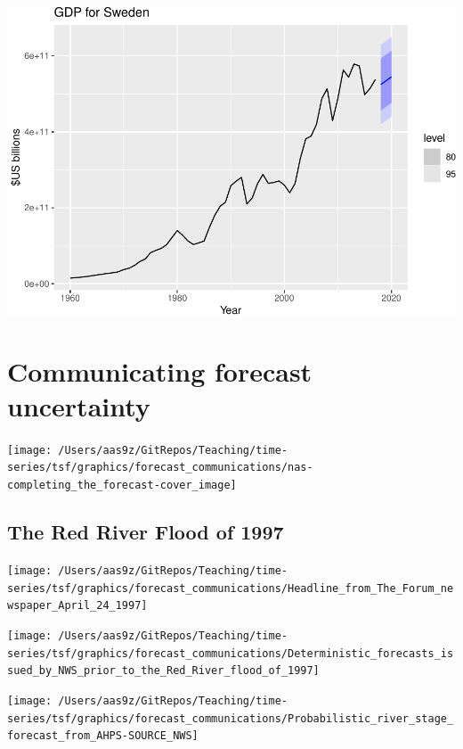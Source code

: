 \documentclass[
]{book}
\newenvironment{Shaded}{\begin{snugshade}}{\end{snugshade}}
\newcommand{\FunctionTok}[1]{\textcolor[rgb]{0.00,0.00,0.00}{#1}}
\newcommand{\NormalTok}[1]{#1}
\newcommand{\SpecialCharTok}[1]{\textcolor[rgb]{0.00,0.00,0.00}{#1}}
\newcommand{\StringTok}[1]{\textcolor[rgb]{0.31,0.60,0.02}{#1}}
\begin{document}
\begin{Shaded}
\end{Shaded}

\includegraphics{graphics/visualize forecasts 2-1.pdf}

\hypertarget{communicating-forecast-uncertainty}{%
\chapter{Communicating forecast uncertainty}\label{communicating-forecast-uncertainty}}

\texttt{[image: /Users/aas9z/GitRepos/Teaching/time-series/tsf/graphics/forecast\_communications/nas-completing\_the\_forecast-cover\_image]}

\hypertarget{the-red-river-flood-of-1997}{%
\section{The Red River Flood of 1997}\label{the-red-river-flood-of-1997}}

\texttt{[image: /Users/aas9z/GitRepos/Teaching/time-series/tsf/graphics/forecast\_communications/Headline\_from\_The\_Forum\_newspaper\_April\_24\_1997]}

\texttt{[image: /Users/aas9z/GitRepos/Teaching/time-series/tsf/graphics/forecast\_communications/Deterministic\_forecasts\_issued\_by\_NWS\_prior\_to\_the\_Red\_River\_flood\_of\_1997]}

\texttt{[image: /Users/aas9z/GitRepos/Teaching/time-series/tsf/graphics/forecast\_communications/Probabilistic\_river\_stage\_forecast\_from\_AHPS-SOURCE\_NWS]}

  
\end{document}
